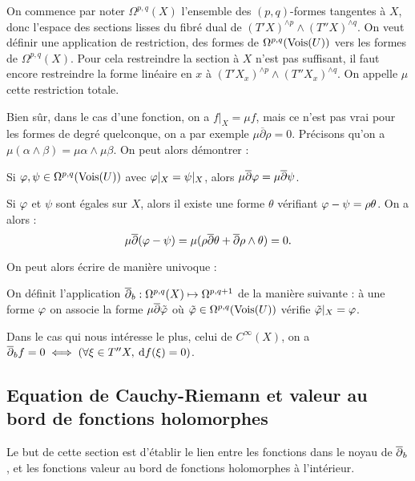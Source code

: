On commence par noter $\Omega^{p,q}(X)$ l'ensemble des $(p,q)$-formes
tangentes à $X$, donc l'espace des sections lisses du fibré dual de
$(T'X)^{\wedge p} \wedge (T''X)^{\wedge q}$. On veut définir une
application de restriction, des formes de $\Omega^{p,q}(\operatorname{Vois} (U))$
vers les formes de $\Omega^{p,q}(X)$. Pour cela restreindre la section à $X$ n'est pas suffisant, il faut encore restreindre la forme linéaire en $x$ à $(T'X_x)^{\wedge p} \wedge (T''X_x)^{\wedge q}$. On appelle $\mu$ cette restriction totale. 

Bien sûr, dans le cas d'une fonction, on a $f|_X = \mu f$, mais ce n'est pas vrai pour les formes de degré quelconque, on a par exemple $\mu \overline{\partial}\rho =0$. Précisons qu'on a $\mu(\alpha \wedge \beta) = \mu \alpha \wedge \mu \beta$. On peut alors démontrer :

\begin{lem}
	Si $\varphi,\psi \in \Omega^{p,q}(\operatorname{Vois} (U))$ avec $\varphi|_X=\psi|_X$, alors $\mu \overline{\partial}\varphi = \mu \overline{\partial}\psi$.
\end{lem}
\begin{preuve}
	Si $\varphi$ et $\psi$ sont égales sur $X$, alors il existe une forme $\theta$ vérifiant $\varphi-\psi = \rho\theta$. On a alors :
	\begin{equation*}
		\mu \overline{\partial}(\varphi-\psi) = \mu(\rho \overline{\partial}\theta + \overline{\partial}\rho \wedge \theta) = 0.
	\end{equation*}
\end{preuve}

On peut alors écrire de manière univoque :
\begin{defn}
	On définit l'application $\overline{\partial}_b : \Omega^{p,q}(X)\mapsto \Omega^{p,q+1}$ de la manière suivante : à une forme $\varphi$ on associe la forme $\mu \overline{\partial}\tilde{\varphi}$ où $\tilde{\varphi} \in \Omega^{p,q}(\operatorname{Vois}(U))$ vérifie $\tilde{\varphi}|_X=\varphi$.
\end{defn}
\begin{rem}
	Dans le cas qui nous intéresse le plus, celui de $C^{\infty}(X)$, on a $\overline{\partial}_b f = 0 \iff (\forall \xi \in T''X,\:\mathrm{d} f(\xi)=0)$.
\end{rem}

\subsection{Equation de Cauchy-Riemann et valeur au bord de fonctions holomorphes}
Le but de cette section est d'établir le lien entre les fonctions dans le noyau de $\overline{\partial}_b$, et les fonctions valeur au bord de fonctions holomorphes à l'intérieur.

